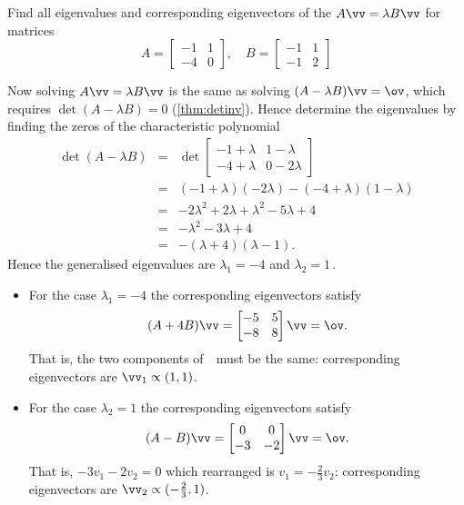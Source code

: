 \begin{example} \label{eg:}
Find all eigenvalues and corresponding eigenvectors of the  \(A\vv=\lambda B\vv\) for matrices
\begin{equation*}
A=\begin{bmatrix} -1&1\\-4&0 \end{bmatrix},\quad
B=\begin{bmatrix} -1&1\\-1&2 \end{bmatrix}
\end{equation*}
\begin{solution} 
Now solving \(A\vv=\lambda B\vv\) is the same as solving \((A-\lambda B)\vv=\ov\), which requires \(\det(A-\lambda B)=0\) (\autoref{thm:detinv}).
Hence determine the eigenvalues by finding the zeros of the characteristic polynomial
\begin{eqnarray*}
\det(A-\lambda B)
&=&\det\begin{bmatrix} -1+\lambda&1-\lambda\\-4+\lambda&0-2\lambda \end{bmatrix}
\\&=&(-1+\lambda)(-2\lambda)-(-4+\lambda)(1-\lambda)
\\&=&-2\lambda^2+2\lambda+\lambda^2-5\lambda+4
\\&=&-\lambda^2-3\lambda+4
\\&=&-(\lambda+4)(\lambda-1).
\end{eqnarray*}
Hence the generalised eigenvalues are \(\lambda_1=-4\) and \(\lambda_2=1\)\,.
\begin{itemize}
\item For the case \(\lambda_1=-4\) the corresponding eigenvectors satisfy
\begin{equation*}
(A+4B)\vv=\begin{bmatrix} -5&5\\-8&8 \end{bmatrix}\vv=\ov.
\end{equation*}
That is, the two components of~\vv\ must be the same: corresponding eigenvectors are \(\vv_1\propto(1,1)\).

\item For the case \(\lambda_2=1\) the corresponding eigenvectors satisfy
\begin{equation*}
(A-B)\vv=\begin{bmatrix} 0&0\\-3&-2 \end{bmatrix}\vv=\ov.
\end{equation*}
That is, \(-3v_1-2v_2=0\) which rearranged is \(v_1=-\tfrac23v_2\): corresponding eigenvectors are \(\vv_2\propto(-\tfrac23,1)\).
\end{itemize}
\end{solution}
\end{example}




